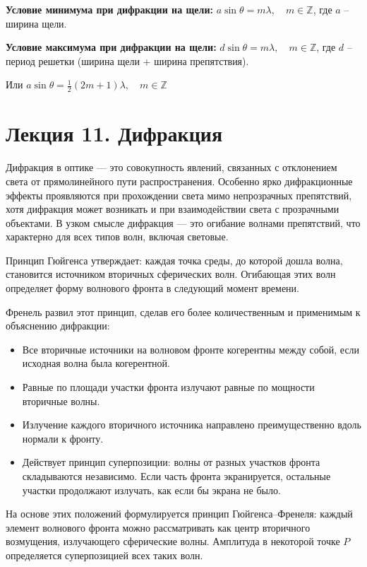 \documentclass[12pt]{article}
\begin{document}
\textbf{Условие минимума при дифракции на щели:} $a \sin \theta = m \lambda, \quad m \in \mathbb{Z}$, где $a$ -- ширина щели.

\textbf{Условие максимума при дифракции на щели:} $d \sin \theta = m \lambda, \quad m \in \mathbb{Z}$, где $d$ -- период решетки (ширина щели + ширина препятствия).

Или $a \sin \theta = \frac{1}{2} (2m + 1) \lambda, \quad m \in \mathbb{Z}$






\section{Лекция 11. Дифракция}

Дифракция в оптике — это совокупность явлений, связанных с отклонением света от прямолинейного пути распространения. Особенно ярко дифракционные эффекты проявляются при прохождении света мимо непрозрачных препятствий, хотя дифракция может возникать и при взаимодействии света с прозрачными объектами. В узком смысле дифракция — это огибание волнами препятствий, что характерно для всех типов волн, включая световые.

Принцип Гюйгенса утверждает: каждая точка среды, до которой дошла волна, становится источником вторичных сферических волн. Огибающая этих волн определяет форму волнового фронта в следующий момент времени.

Френель развил этот принцип, сделав его более количественным и применимым к объяснению дифракции:
\begin{itemize}
  \item Все вторичные источники на волновом фронте когерентны между собой, если исходная волна была когерентной.
  \item Равные по площади участки фронта излучают равные по мощности вторичные волны.
  \item Излучение каждого вторичного источника направлено преимущественно вдоль нормали к фронту.
  \item Действует принцип суперпозиции: волны от разных участков фронта складываются независимо. Если часть фронта экранируется, остальные участки продолжают излучать, как если бы экрана не было.
\end{itemize}

На основе этих положений формулируется принцип Гюйгенса–Френеля: каждый элемент волнового фронта можно рассматривать как центр вторичного возмущения, излучающего сферические волны. Амплитуда в некоторой точке $P$ определяется суперпозицией всех таких волн.
\end{document}
